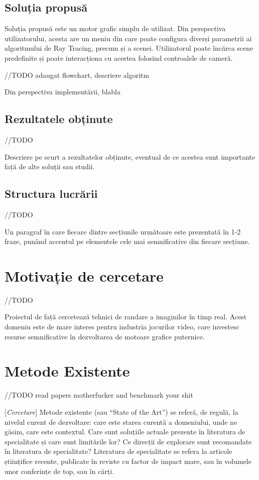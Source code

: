\documentclass[12pt,a4paper]{report}
\newcommand{\worktype}[1]{[\textit{#1}] }
\newcommand{\cercetare}{\worktype{Cercetare}}
\begin{document}
\section{Soluția propusă}
Soluția propusă este un motor grafic simplu de utilizat. Din perspectiva utilizatorului,
acesta are un meniu din care poate configura diverși parametrii ai algoritmului
de Ray Tracing, precum și a scenei. Utilizatorul poate încărca scene predefinite
și poate interacționa cu acestea folosind controalele de cameră.

//TODO adaugat flowchart, descriere algoritm

Din perspectiva implementării, blabla

\section{Rezultatele obținute}

//TODO

Descriere pe scurt a rezultatelor obținute, eventual de ce acestea sunt importante față de alte soluții sau studii.

\section{Structura lucrării}

//TODO

Un paragraf în care fiecare dintre secțiunile următoare este prezentată în 1-2 fraze, punând accentul pe elementele cele mai semnificative din fiecare secțiune.

\chapter{Motivație de cercetare}

//TODO

Proiectul de față cercetează tehnici de randare a imaginilor în timp real. Acest
domeniu este de mare interes pentru industria jocurilor video, care investesc
resurse semnificative în dezvoltarea de motoare grafice puternice.

\chapter{Metode Existente}

//TODO read papers motherfucker and benchmark your shit

\cercetare Metode existente (sau ``State of the Art'') se referă, de regulă, la nivelul curent de dezvoltare: care este starea curentă a domeniului, unde ne găsim, care este contextul. Care sunt soluțiile actuale prezente în literatura de specialitate și care sunt limitările lor? Ce direcții de explorare sunt recomandate în literatura de specialitate? Literatura de specialitate se refera la articole științifice recente, publicate în reviste cu factor de impact mare, sau în volumele unor conferințe de top, sau în cărți.
\end{document}
